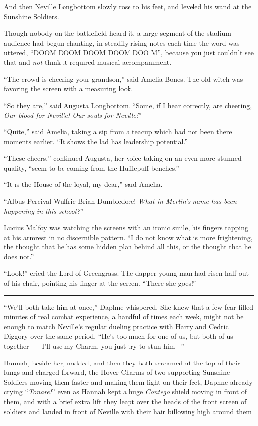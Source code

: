 And then Neville Longbottom slowly rose to his feet, and leveled his wand at the Sunshine Soldiers.

Though nobody on the battlefield heard it, a large segment of the stadium audience had begun chanting, in steadily rising notes each time the word was uttered, ``DOOM DOOM DOOM DOOM DOO M'', because you just couldn't see that and \emph{not} think it required musical accompaniment.

``The crowd is cheering your grandson,'' said Amelia Bones. The old witch was favoring the screen with a measuring look.

``So they are,'' said Augusta Longbottom. ``Some, if I hear correctly, are cheering, \emph{Our blood for Neville! Our souls for Neville!}''

``Quite,'' said Amelia, taking a sip from a teacup which had not been there moments earlier. ``It shows the lad has leadership potential.''

``These cheers,'' continued Augusta, her voice taking on an even more stunned quality, ``seem to be coming from the Hufflepuff benches.''

``It is the House of the loyal, my dear,'' said Amelia.

``Albus Percival Wulfric Brian Dumbledore! \emph{What in Merlin's name has been happening in this school?}''

Lucius Malfoy was watching the screens with an ironic smile, his fingers tapping at his armrest in no discernible pattern. ``I do not know what is more frightening, the thought that he has some hidden plan behind all this, or the thought that he does not.''

``Look!'' cried the Lord of Greengrass. The dapper young man had risen half out of his chair, pointing his finger at the screen. ``There she goes!''

\begin{center}\rule{3in}{0.4pt}\end{center}

``We'll both take him at once,'' Daphne whispered. She knew that a few fear-filled minutes of real combat experience, a handful of times each week, might not be enough to match Neville's regular dueling practice with Harry and Cedric Diggory over the same period. ``He's too much for one of us, but both of us together~--- I'll use my Charm, you just try to stun him~-''

Hannah, beside her, nodded, and then they both screamed at the top of their lungs and charged forward, the Hover Charms of two supporting Sunshine Soldiers moving them faster and making them light on their feet, Daphne already crying ``\emph{Tonare!}'' even as Hannah kept a huge \emph{Contego} shield moving in front of them, and with a brief extra lift they leapt over the heads of the front screen of soldiers and landed in front of Neville with their hair billowing high around them -

